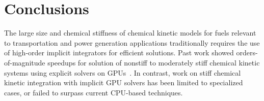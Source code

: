\documentclass[preprint]{elsarticle}
\begin{document}
\section{Conclusions}
\label{S:conclusions}

The large size and chemical stiffness of chemical kinetic models for fuels relevant to transportation and power generation applications traditionally requires the use of high-order implicit integrators for efficient solutions.
Past work showed orders-of-magnitude speedups for solution of nonstiff to moderately stiff chemical kinetic systems using explicit solvers on GPUs~\cite{Niemeyer:2011aa,Le2013596,Niemeyer:2014aa}.
In contrast, work on stiff chemical kinetic integration with implicit GPU solvers has been limited to specialized cases, or failed to surpass current CPU-based techniques.
\end{document}

